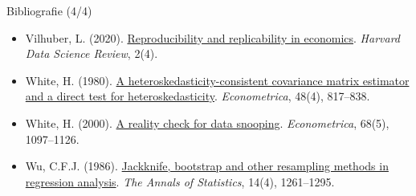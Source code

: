 \begin{frame}{Bibliografie (4/4)}
\begin{itemize}
    \item Vilhuber, L. (2020). \href{https://doi.org/10.1162/99608f92.4f6b9e67}{Reproducibility and replicability in economics}. \emph{Harvard Data Science Review}, 2(4).
    \item White, H. (1980). \href{https://doi.org/10.2307/1912934}{A heteroskedasticity-consistent covariance matrix estimator and a direct test for heteroskedasticity}. \emph{Econometrica}, 48(4), 817--838.
    \item White, H. (2000). \href{https://doi.org/10.1111/1468-0262.00152}{A reality check for data snooping}. \emph{Econometrica}, 68(5), 1097--1126.
    \item Wu, C.F.J. (1986). \href{https://doi.org/10.1214/aos/1176350142}{Jackknife, bootstrap and other resampling methods in regression analysis}. \emph{The Annals of Statistics}, 14(4), 1261--1295.
\end{itemize}
\end{frame}


